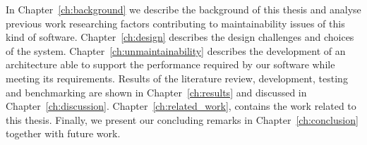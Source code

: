 In Chapter~\ref{ch:background} we describe the background of this thesis and analyse previous work researching factors contributing to maintainability issues of this kind of software. Chapter~\ref{ch:design} describes the design challenges and choices of the system. Chapter~\ref{ch:unmaintainability} describes the development of an architecture able to support the performance required by our software while meeting its requirements. Results of the literature review, development, testing and benchmarking are shown in Chapter~\ref{ch:results} and discussed in Chapter~\ref{ch:discussion}. Chapter~\ref{ch:related_work}, contains the work related to this thesis. Finally, we present our concluding remarks in Chapter~\ref{ch:conclusion} together with future work.

